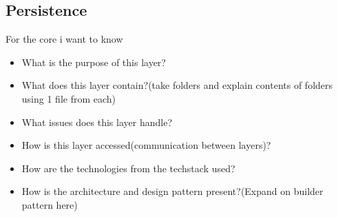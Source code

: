 \subsection{Persistence}
For the core i want to know
\begin{itemize}
    \item What is the purpose of this layer?
    \item What does this layer contain?(take folders and explain contents of folders using 1 file from each)
    \item What issues does this layer handle?
    \item How is this layer accessed(communication between layers)?
    \item How are the technologies from the techstack used?
    \item How is the architecture and design pattern present?(Expand on builder pattern here)
\end{itemize}
